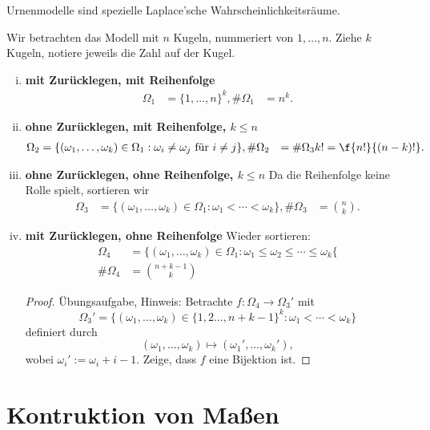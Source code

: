 \begin{ex}[Urnenmodelle] \label{1.2.8}
	Urnenmodelle sind spezielle Laplace'sche Wahrscheinlichkeitsräume.

	Wir betrachten das Modell mit $n$ Kugeln, nummeriert von $1, \dotsc, n$.
	Ziehe $k$ Kugeln, notiere jeweils die Zahl auf der Kugel.
	\begin{enumerate}[(i)]
		\item
			\textbf{mit Zurücklegen, mit Reihenfolge}
			\begin{align*}
				\Omega_1 &= \{1, \dotsc, n\}^k,
				\# \Omega_1 &= n^k.
			\end{align*}
		\item
			\textbf{ohne Zurücklegen, mit Reihenfolge, $k \le n$}
			\begin{align*}
				\Omega_2 &= \{(\omega_1,\dotsc, \omega_k) \in \Omega_1 : \omega_i \neq \omega_j \text{ für } i \neq j \},
				\# \Omega_2 &= \# \Omega_3 k! = \f {n!}{(n-k)!}.
			\end{align*}
		\item
			\textbf{ohne Zurücklegen, ohne Reihenfolge, $k \le n$}
			Da die Reihenfolge keine Rolle spielt, sortieren wir
			\begin{align*}
				\Omega_3 &= \{(\omega_1,\dotsc, \omega_k) \in \Omega_1 : \omega_1 < \dotsb < \omega_k  \},
				\# \Omega_3 &= \binom{n}{k}.
			\end{align*}
		\item
			\textbf{mit Zurücklegen, ohne Reihenfolge}
			Wieder sortieren:
			\begin{align*}
				\Omega_4 &= \{ (\omega_1, \dotsc, \omega_k) \in \Omega_1 : \omega_1 \le \omega_2 \le \dotsb \le \omega_k \{ \\
				\# \Omega_4 &= \binom{n+k-1}{k}
			\end{align*}
			\begin{proof}
				Übungsaufgabe, Hinweis:
				Betrachte $f: \Omega_4 \to \Omega_3'$ mit
				\[
					\Omega_3' = \{ (\omega_1, \dotsc, \omega_k) \in \{1,2\dotsc, n+k-1\}^k : \omega_1 < \dotsb < \omega_k \}
				\]
				definiert durch
				\[
					(\omega_1, \dotsc, \omega_k) \mapsto (\omega_1', \dotsc, \omega_k'),
				\]
				wobei $\omega_i' := \omega_i + i- 1$.
				Zeige, dass $f$ eine Bijektion ist.
			\end{proof}
	\end{enumerate}
\end{ex}


\section{Kontruktion von Maßen}


